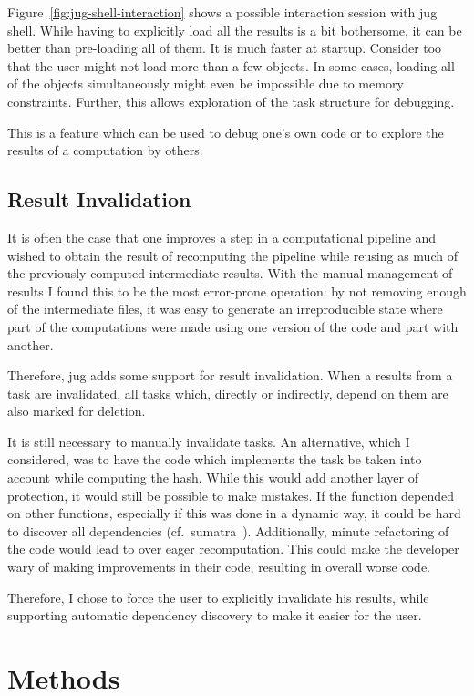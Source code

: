 \documentclass{article}
\begin{document}
Figure~\ref{fig:jug-shell-interaction} shows a possible interaction session
with jug shell. While having to explicitly load all the results is a bit
bothersome, it can be better than pre-loading all of them. It is much faster at
startup. Consider too that the user might not load more than a few objects. In
some cases, loading all of the objects simultaneously might even be impossible
due to memory constraints. Further, this allows exploration of the task
structure for debugging.

This is a feature which can be used to debug one's own code or to explore the
results of a computation by others.

\subsection{Result Invalidation}

It is often the case that one improves a step in a computational pipeline and
wished to obtain the result of recomputing the pipeline while reusing as much
of the previously computed intermediate results. With the manual management of
results I found this to be the most error-prone operation: by not removing
enough of the intermediate files, it was easy to generate an irreproducible
state where part of the computations were made using one version of the code
and part with another.

Therefore, jug adds some support for result invalidation. When a results from a
task are invalidated, all tasks which, directly or indirectly, depend on them
are also marked for deletion.

It is still necessary to manually invalidate tasks. An alternative, which I
considered, was to have the code which implements the task be taken into
account while computing the hash. While this would add another layer of
protection, it would still be possible to make mistakes. If the function
depended on other functions, especially if this was done in a dynamic way, it
could be hard to discover all dependencies (cf.\ sumatra~\citep{sumatra}).
Additionally, minute refactoring of the code would lead to over eager
recomputation. This could make the developer wary of making improvements in
their code, resulting in overall worse code.

Therefore, I chose to force the user to explicitly invalidate his results,
while supporting automatic dependency discovery to make it easier for the user.

\section{Methods}
\end{document}
